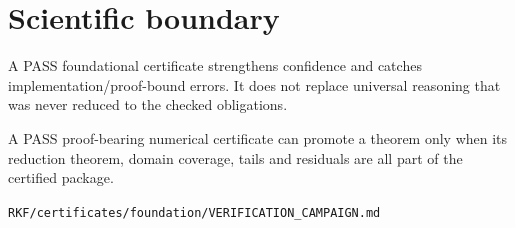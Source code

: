 \hypertarget{scientific-boundary}{%
\section{Scientific boundary}\label{scientific-boundary}}

A PASS foundational certificate strengthens confidence and catches implementation/proof-bound errors. It does not replace universal reasoning that was never reduced to the checked obligations.

A PASS proof-bearing numerical certificate can promote a theorem only when its reduction theorem, domain coverage, tails and residuals are all part of the certified package.

\begin{flushright}\small\texttt{RKF/certificates/foundation/VERIFICATION\_CAMPAIGN.md}\end{flushright}
